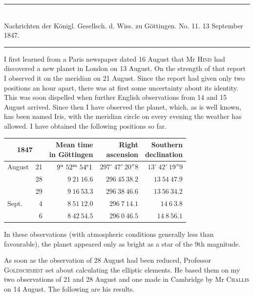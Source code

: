 \clearpage
{}
\begin{center}
\rule{0.55\linewidth}{0.4pt}\\[2pt]
Nachrichten der Königl. Gesellsch. d. Wiss. zu Göttingen. No. 11. 13 September 1847.\\[2pt]
\rule{0.55\linewidth}{0.4pt}
\end{center}

I first learned from a Paris newspaper dated 16 August that Mr \textsc{Hind} had discovered a new planet in London on 13 August. On the strength of that report I observed it on the meridian on 21 August. Since the report had given only two positions an hour apart, there was at first some uncertainty about its identity. This was soon dispelled when further English observations from 14 and 15 August arrived. Since then I have observed the planet, which, as is well known, has been named Iris, with the meridian circle on every evening the weather has allowed. I have obtained the following positions so far.

\begin{center}
\setlength{\tabcolsep}{4pt}
\begin{tabular}{lr|r|r|r}
\multicolumn{2}{c|}{1847} & \shortstack{Mean time\\in Göttingen} & \shortstack{Right\\ascension} & \shortstack{Southern\\declination} \\\hline
August & 21 & $9^{\rm u}\ 52^{\rm m}\ 54^{\rm s}1$ & $297^\circ\ 47'\ 20''8$ & $13^\circ\ 42'\ 19''9$ \\
 & 28 & $9\ 21\ 16.6$ & $296\ 45\ 38.2$ & $13\ 54\ 47.9$ \\
 & 29 & $9\ 16\ 53.3$ & $296\ 38\ 46.6$ & $13\ 56\ 34.2$ \\
Sept. & 4 & $8\ 51\ 12.0$ & $296\ 7\ 14.1$ & $14\ 6\ 3.8$ \\
 & 6 & $8\ 42\ 54.5$ & $296\ 0\ 46.5$ & $14\ 8\ 56.1$ \\
\end{tabular}
\end{center}

In these observations (with atmospheric conditions generally less than favourable), the planet appeared only as bright as a star of the 9th magnitude.

As soon as the observation of 28 August had been reduced, Professor \textsc{Goldschmidt} set about calculating the elliptic elements. He based them on my two observations of 21 and 28 August and one made in Cambridge by Mr \textsc{Challis} on 14 August. The following are his results.

